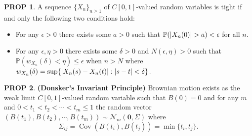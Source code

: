 \documentclass[hidelinks,11pt]{article}
\theoremstyle{definition}
\theoremstyle{dotless}
\newtheorem{prop}{PROP}[section]
\theoremstyle{remark}
\DeclareMathOperator{\Cov}{Cov}
\DeclareMathOperator{\1}{\mathbf{1}}
\begin{document}
\begin{prop}
A sequence $\{X_n\}_{n\geq1}$ of $C[0,1]$-valued random variables is tight if and only the following two conditions hold:\begin{itemize}
    \item For any $\epsilon>0$ there exists some $a>0$ such that $\mathbb{P}(\abs{X_n(0)}>a)<\epsilon$ for all $n$.
    \item For any $\epsilon,\eta>0$ there exists some $\delta>0$ and $N(\epsilon,\eta)>0$ such that $\mathbb{P}(w_{X_n}(\delta)<\eta)\leq\epsilon$ when $n>N$ where $w_{X_n}(\delta)=\sup\{\abs{X_n(s)-X_n(t)}:\abs{s-t}<\delta\}$.
\end{itemize}
\end{prop}

\begin{prop}\textup{\textbf{(Donsker's Invariant Principle)}} Brownian motion exists as the weak limit $C[0,1]$-valued random variable such that $B(0)=0$ and for any $m$ and $0<t_1<t_2<\cdots<t_m\leq1$ the random vector $(B(t_1),B(t_2),\cdots,B(t_m))\sim\mathcal{N}_m(\mathbf{0},\Sigma)$ where
\[\Sigma_{ij}=\Cov(B(t_i),B(t_j))=\min\{t_i,t_j\}.\]
\end{prop}
\end{document}
